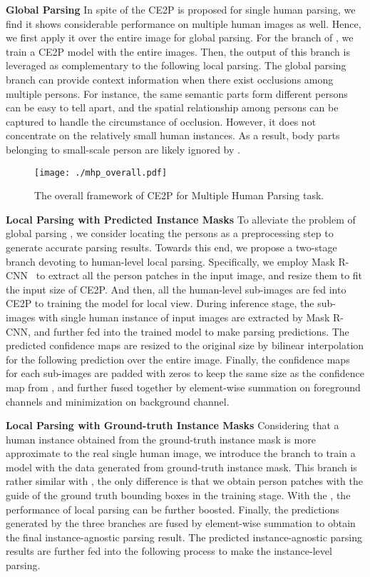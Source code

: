 \documentclass[letterpaper]{article} \usepackage{formatting-instructions-latex-2019}  \usepackage{times}  \usepackage{helvet}  \usepackage{courier}  \usepackage{url}  \usepackage{graphicx}  \frenchspacing  \setlength{\pdfpagewidth}{8.5in}  \setlength{\pdfpageheight}{11in}
\begin{document}
\noindent \textbf{Global Parsing } 
In spite of the CE2P is proposed for single human parsing, we find it shows considerable performance on multiple human images as well. Hence, we first apply it over the entire image for global parsing. For the branch of , we train a CE2P model with the entire images. Then, the output of this branch is leveraged as complementary to the following local parsing. The global parsing branch can provide context information when there exist occlusions among multiple persons. For instance, the same semantic parts form different persons can be easy to tell apart, and the spatial relationship among persons can be captured to handle the circumstance of occlusion. However, it does not concentrate on the relatively small human instances. As a result, body parts belonging to small-scale person are likely ignored by .   


\begin{figure}[t]
    \begin{center}
        \texttt{[image: ./mhp\_overall.pdf]}
    \end{center}
    \caption{The overall framework of CE2P for Multiple Human Parsing task.}
    \label{fig:mhp_overall}
\end{figure}

\noindent \textbf{Local Parsing with Predicted Instance Masks }
 To alleviate the problem of global parsing , we consider locating the persons as a preprocessing step to generate accurate parsing results. Towards this end, we propose a two-stage branch devoting to human-level local parsing. Specifically, we employ Mask R-CNN~\cite{he2017mask} to extract all the person patches in the input image, and resize them to fit the input size of CE2P. And then, all the human-level sub-images are fed into CE2P to training the model for local view. During inference stage, the sub-images with single human instance of input images are extracted by Mask R-CNN, and further fed into the trained model to make parsing predictions. The predicted confidence maps are resized to the original size by bilinear interpolation for the following prediction over the entire image. Finally, the confidence maps for each sub-images are padded with zeros to keep the same size as the confidence map from , and further fused together by element-wise summation on foreground channels and minimization on background channel. 

\noindent \textbf{Local Parsing with Ground-truth Instance Masks } Considering that a human instance obtained from the ground-truth instance mask is more approximate to the real single human image, we introduce the branch  to train a model with the data generated from ground-truth instance mask. This branch is rather similar with , the only difference is that we obtain person patches with the guide of the ground truth bounding boxes in the training stage. With the , the performance of local parsing can be further boosted.  Finally, the predictions generated by the three branches are fused by element-wise summation to obtain the final instance-agnostic parsing result. The predicted instance-agnostic parsing results are further fed into the following process to make the instance-level parsing.  
\end{document}

